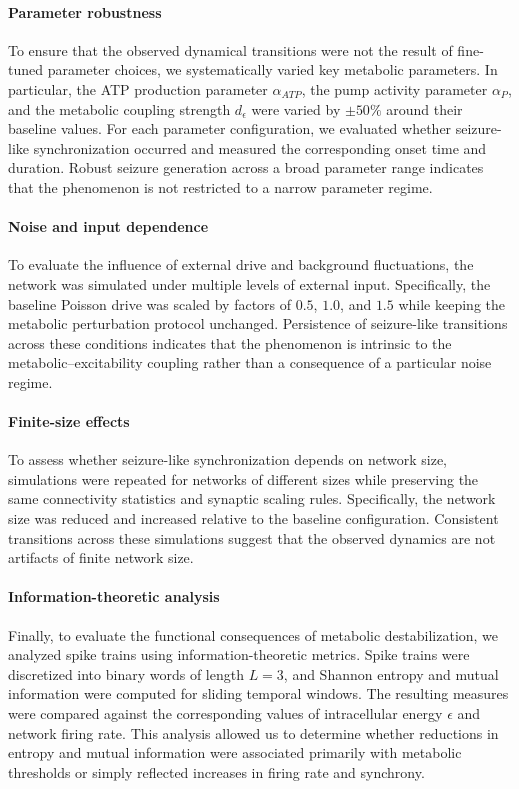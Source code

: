 \paragraph{Parameter robustness}
To ensure that the observed dynamical transitions were not the result of fine-tuned parameter choices, we systematically varied key metabolic parameters. In particular, the ATP production parameter $\alpha_{ATP}$, the pump activity parameter $\alpha_P$, and the metabolic coupling strength $d_{\epsilon}$ were varied by $\pm 50\%$ around their baseline values. For each parameter configuration, we evaluated whether seizure-like synchronization occurred and measured the corresponding onset time and duration. Robust seizure generation across a broad parameter range indicates that the phenomenon is not restricted to a narrow parameter regime.

\paragraph{Noise and input dependence}
To evaluate the influence of external drive and background fluctuations, the network was simulated under multiple levels of external input. Specifically, the baseline Poisson drive was scaled by factors of $0.5$, $1.0$, and $1.5$ while keeping the metabolic perturbation protocol unchanged. Persistence of seizure-like transitions across these conditions indicates that the phenomenon is intrinsic to the metabolic–excitability coupling rather than a consequence of a particular noise regime.

\paragraph{Finite-size effects}
To assess whether seizure-like synchronization depends on network size, simulations were repeated for networks of different sizes while preserving the same connectivity statistics and synaptic scaling rules. Specifically, the network size was reduced and increased relative to the baseline configuration. Consistent transitions across these simulations suggest that the observed dynamics are not artifacts of finite network size.

\paragraph{Information-theoretic analysis}
Finally, to evaluate the functional consequences of metabolic destabilization, we analyzed spike trains using information-theoretic metrics. Spike trains were discretized into binary words of length $L=3$, and Shannon entropy and mutual information were computed for sliding temporal windows. The resulting measures were compared against the corresponding values of intracellular energy $\epsilon$ and network firing rate. This analysis allowed us to determine whether reductions in entropy and mutual information were associated primarily with metabolic thresholds or simply reflected increases in firing rate and synchrony.